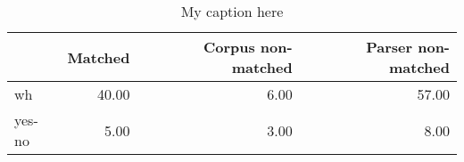\begin{table}[!ht]
\centering
\begin{tabular}{lrrr}
\toprule
{} &  Matched &  Corpus non-matched &  Parser non-matched \\
\midrule
wh     &    40.00 &                6.00 &               57.00 \\
yes-no &     5.00 &                3.00 &                8.00 \\
\bottomrule
\end{tabular}
\caption{My caption here}
\label{tab:INTERROGATIVE-ocd-data}
\end{table}